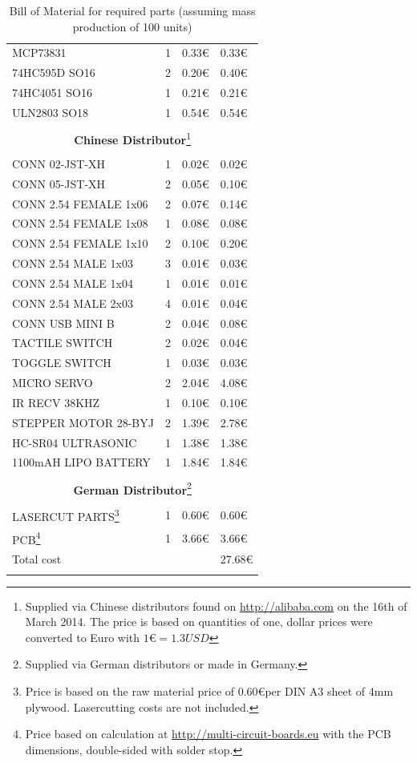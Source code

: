 \documentclass[11pt,a4paper]{article}
\begin{document}
\begin{longtable}{p{}p{}p{}p{}}
MCP73831 & 1 & 0.33\euro & 0.33\euro \\
74HC595D SO16 & 2 & 0.20\euro & 0.40\euro \\
74HC4051 SO16 & 1 & 0.21\euro & 0.21\euro \\
ULN2803 SO18 & 1 & 0.54\euro & 0.54\euro \\
\\
\multicolumn{4}{c}{\textbf{Chinese Distributor}\footnote{\label{edragon}Supplied via Chinese distributors found on \url{http://alibaba.com} on the 16th of March 2014. The price is based on quantities of one, dollar prices were converted to Euro with $1\euro = 1.3USD$ }}\\
\\
CONN 02-JST-XH & 1 & 0.02\euro & 0.02\euro \\
CONN 05-JST-XH & 2 & 0.05\euro & 0.10\euro \\
CONN 2.54 FEMALE 1x06 & 2 & 0.07\euro & 0.14\euro \\
CONN 2.54 FEMALE 1x08 & 1 & 0.08\euro & 0.08\euro \\
CONN 2.54 FEMALE 1x10 & 2 & 0.10\euro & 0.20\euro \\
CONN 2.54 MALE 1x03 & 3 & 0.01\euro & 0.03\euro \\
CONN 2.54 MALE 1x04 & 1 & 0.01\euro & 0.01\euro \\
CONN 2.54 MALE 2x03 & 4 & 0.01\euro & 0.04\euro \\
CONN USB MINI B & 2 & 0.04\euro & 0.08\euro \\
TACTILE SWITCH & 2 & 0.02\euro & 0.04\euro \\
TOGGLE SWITCH & 1 & 0.03\euro & 0.03\euro \\
MICRO SERVO & 2 & 2.04\euro & 4.08\euro \\
IR RECV 38KHZ & 1 & 0.10\euro & 0.10\euro \\
STEPPER MOTOR 28-BYJ & 2 & 1.39\euro & 2.78\euro \\
HC-SR04 ULTRASONIC & 1 & 1.38\euro & 1.38\euro \\
1100mAH LIPO BATTERY & 1 & 1.84\euro & 1.84\euro \\
\\
\multicolumn{4}{c}{\textbf{German Distributor}\footnote{Supplied via German distributors or made in Germany.}}\\
\\
LASERCUT PARTS\footnote{Price is based on the raw material price of 0.60\euro per DIN A3 sheet of 4mm plywood. Lasercutting costs are not included. } & 1 & 0.60\euro & 0.60\euro \\
PCB\footnote{Price based on calculation at \url{http://multi-circuit-boards.eu} with the PCB dimensions, double-sided with solder stop.} & 1 & 3.66\euro & 3.66\euro \\ \hline\hline
Total cost& & & 27.68\euro \\
\bottomrule
\caption{Bill of Material for required parts (assuming mass production of 100 units)}
\label{tbl:bom}
\end{longtable}
\end{document}
